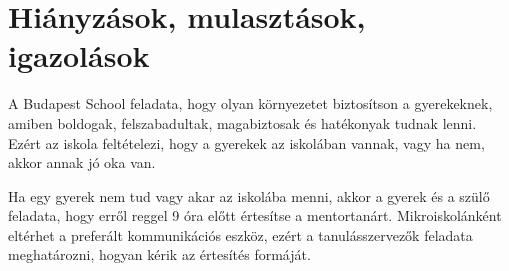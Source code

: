 \section{Hiányzások, mulasztások, igazolások}
A Budapest School feladata, hogy olyan környezetet biztosítson a gyerekeknek,
amiben boldogak, felszabadultak, magabiztosak és hatékonyak tudnak lenni.
Ezért az iskola feltételezi, hogy a gyerekek az iskolában vannak, vagy ha nem,
akkor annak jó oka van.

Ha egy gyerek nem tud vagy akar az iskolába menni, akkor a gyerek és a szülő
feladata, hogy erről reggel 9 óra előtt értesítse a mentortanárt.
Mikroiskolánként eltérhet a preferált kommunikációs eszköz, ezért a
tanulásszervezők feladata meghatározni, hogyan kérik az értesítés formáját.


